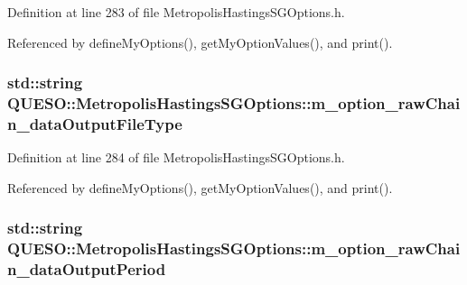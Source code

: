 Definition at line 283 of file Metropolis\-Hastings\-S\-G\-Options.\-h.



Referenced by define\-My\-Options(), get\-My\-Option\-Values(), and print().

\hypertarget{class_q_u_e_s_o_1_1_metropolis_hastings_s_g_options_ae0bc37e9e5982b51f67e9788e4397cfa}{
\subsubsection[{m\-\_\-option\-\_\-raw\-Chain\-\_\-data\-Output\-File\-Type}]{\setlength{\rightskip}{0pt plus 5cm}std\-::string Q\-U\-E\-S\-O\-::\-Metropolis\-Hastings\-S\-G\-Options\-::m\-\_\-option\-\_\-raw\-Chain\-\_\-data\-Output\-File\-Type\hspace{0.3cm}{\ttfamily [private]}}}\label{class_q_u_e_s_o_1_1_metropolis_hastings_s_g_options_ae0bc37e9e5982b51f67e9788e4397cfa}


Definition at line 284 of file Metropolis\-Hastings\-S\-G\-Options.\-h.



Referenced by define\-My\-Options(), get\-My\-Option\-Values(), and print().

\hypertarget{class_q_u_e_s_o_1_1_metropolis_hastings_s_g_options_a60d3d3f6d9bebd55f80e609ceb2fc4db}{
\subsubsection[{m\-\_\-option\-\_\-raw\-Chain\-\_\-data\-Output\-Period}]{\setlength{\rightskip}{0pt plus 5cm}std\-::string Q\-U\-E\-S\-O\-::\-Metropolis\-Hastings\-S\-G\-Options\-::m\-\_\-option\-\_\-raw\-Chain\-\_\-data\-Output\-Period\hspace{0.3cm}{\ttfamily [private]}}}\label{class_q_u_e_s_o_1_1_metropolis_hastings_s_g_options_a60d3d3f6d9bebd55f80e609ceb2fc4db}


